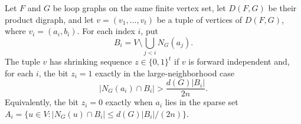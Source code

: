 \begin{definition}
Let \(F\) and \(G\) be loop graphs on the same finite vertex set, let \(D(F,G)\) be their product digraph, and let \(v=(v_1,\ldots,v_t)\) be a tuple of vertices of \(D(F,G)\), where \(v_i=(a_i,b_i)\). For each index \(i\), put
\[
  B_i=V\setminus\bigcup_{j<i}N_G(a_j).
\]
The tuple \(v\) has shrinking sequence \(z\in\{0,1\}^t\) if \(v\) is forward independent and, for each \(i\), the bit \(z_i=1\) exactly in the large-neighborhood case
\[
  |N_G(a_i)\cap B_i|> \frac{d(G)|B_i|}{2n}.
\]
Equivalently, the bit \(z_i=0\) exactly when \(a_i\) lies in the sparse set \(A_i=\{u\in V: |N_G(u)\cap B_i|\le d(G)|B_i|/(2n)\}\).
\end{definition}
